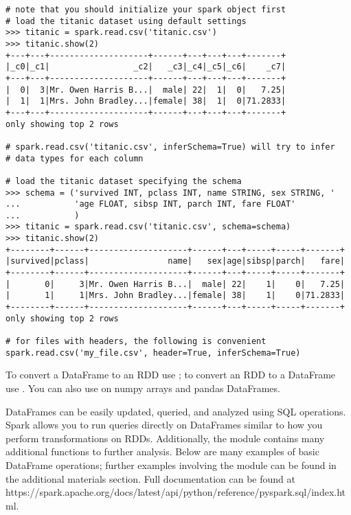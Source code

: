 \begin{lstlisting}
# note that you should initialize your spark object first
# load the titanic dataset using default settings
>>> titanic = spark.read.csv('titanic.csv')
>>> titanic.show(2)
+---+---+--------------------+------+---+---+---+-------+
|_c0|_c1|                 _c2|   _c3|_c4|_c5|_c6|    _c7|
+---+---+--------------------+------+---+---+---+-------+
|  0|  3|Mr. Owen Harris B...|  male| 22|  1|  0|   7.25|
|  1|  1|Mrs. John Bradley...|female| 38|  1|  0|71.2833|
+---+---+--------------------+------+---+---+---+-------+
only showing top 2 rows

# spark.read.csv('titanic.csv', inferSchema=True) will try to infer
# data types for each column

# load the titanic dataset specifying the schema
>>> schema = ('survived INT, pclass INT, name STRING, sex STRING, '
...			  'age FLOAT, sibsp INT, parch INT, fare FLOAT'
...			  )
>>> titanic = spark.read.csv('titanic.csv', schema=schema)
>>> titanic.show(2)
+--------+------+--------------------+------+---+-----+-----+-------+
|survived|pclass|                name|   sex|age|sibsp|parch|   fare|
+--------+------+--------------------+------+---+-----+-----+-------+
|       0|     3|Mr. Owen Harris B...|  male| 22|    1|    0|   7.25|
|       1|     1|Mrs. John Bradley...|female| 38|    1|    0|71.2833|
+--------+------+--------------------+------+---+-----+-----+-------+
only showing top 2 rows

# for files with headers, the following is convenient
spark.read.csv('my_file.csv', header=True, inferSchema=True)
\end{lstlisting}

\begin{info}
To convert a DataFrame to an RDD use ; to convert an RDD to a DataFrame use . You can also use  on numpy arrays and pandas DataFrames.
\end{info}

DataFrames can be easily updated, queried, and analyzed using SQL operations.
Spark allows you to run queries directly on DataFrames similar to how you perform transformations on RDDs. Additionally, the  module contains many additional functions to further analysis.
Below are many examples of basic DataFrame operations; further examples involving the  module can be found in the additional materials section.
Full documentation can be found at https://spark.apache.org/docs/latest/api/python/reference/pyspark.sql/index.html.

